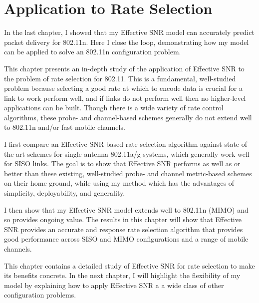 \ifx\mainfile\undefined

\setcounter{chapter}{6} %
\fi

\cleardoublepage
\chapter{Application to Rate Selection}
\label{chap:rate}

In the last chapter, I showed that my Effective SNR model can accurately predict packet delivery for 802.11n. Here I close the loop, demonstrating how my model can be applied to solve an 802.11n configuration problem.

This chapter presents an in-depth study of the application of Effective SNR to the problem of rate selection for 802.11. This is a fundamental, well-studied problem because selecting a good rate at which to encode data is crucial for a link to work perform well, and if links do not perform well then no higher-level applications can be built. Though there is a wide variety of rate control algorithms, these probe- and channel-based schemes generally do not extend well to 802.11n and/or fast mobile channels.

I first compare an Effective SNR-based rate selection algorithm against state-of-the-art schemes for single-antenna 802.11a/g systems, which generally work well for SISO links. The goal is to show that Effective SNR performs as well as or better than these existing, well-studied probe- and channel metric-based schemes on their home ground, while using my method which has the advantages of simplicity, deployability, and generality.

I then show that my Effective SNR model extends well to 802.11n (MIMO) and so provides ongoing value. The results in this chapter will show that Effective SNR provides an accurate and response rate selection algorithm that provides good performance across SISO and MIMO configurations and a range of mobile channels.

This chapter contains a detailed study of Effective SNR for rate selection to make its benefits concrete. In the next chapter, I will highlight the flexibility of my model by explaining how to apply Effective SNR a a wide class of other configuration problems.


